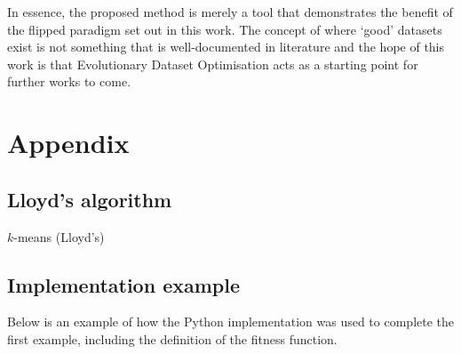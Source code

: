 In essence, the proposed method is merely a tool that demonstrates the benefit
of the flipped paradigm set out in this work. The concept of where `good'
datasets exist is not something that is well-documented in literature and the
hope of this work is that Evolutionary Dataset Optimisation acts as a starting
point for further works to come.


\section*{Appendix}

\subsection{Lloyd's algorithm}\label{app:kmeans}

\balg[H]%

\caption{\(k\)-means (Lloyd's)}
\ealg%

\subsection{Implementation example}\label{app:code}

Below is an example of how the Python implementation was used to complete the
first example, including the definition of the fitness function.

